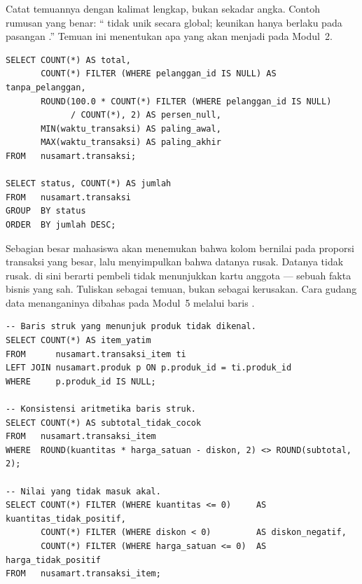 Catat temuannya dengan kalimat lengkap, bukan sekadar angka. Contoh rumusan
yang benar: `` tidak unik secara global; keunikan hanya
berlaku pada pasangan .'' Temuan ini
menentukan apa yang akan menjadi  pada Modul~2.


\begin{lstlisting}[style=sqlgaya]
SELECT COUNT(*) AS total,
       COUNT(*) FILTER (WHERE pelanggan_id IS NULL) AS tanpa_pelanggan,
       ROUND(100.0 * COUNT(*) FILTER (WHERE pelanggan_id IS NULL)
             / COUNT(*), 2) AS persen_null,
       MIN(waktu_transaksi) AS paling_awal,
       MAX(waktu_transaksi) AS paling_akhir
FROM   nusamart.transaksi;

SELECT status, COUNT(*) AS jumlah
FROM   nusamart.transaksi
GROUP  BY status
ORDER  BY jumlah DESC;
\end{lstlisting}

\begin{peringatan}
Sebagian besar mahasiswa akan menemukan bahwa kolom 
bernilai  pada proporsi transaksi yang besar, lalu menyimpulkan
bahwa datanya rusak. Datanya tidak rusak.  di sini berarti
pembeli tidak menunjukkan kartu anggota --- sebuah fakta bisnis yang sah.
Tuliskan sebagai temuan, bukan sebagai kerusakan. Cara gudang data menanganinya
dibahas pada Modul~5 melalui baris .
\end{peringatan}


\begin{lstlisting}[style=sqlgaya]
-- Baris struk yang menunjuk produk tidak dikenal.
SELECT COUNT(*) AS item_yatim
FROM      nusamart.transaksi_item ti
LEFT JOIN nusamart.produk p ON p.produk_id = ti.produk_id
WHERE     p.produk_id IS NULL;

-- Konsistensi aritmetika baris struk.
SELECT COUNT(*) AS subtotal_tidak_cocok
FROM   nusamart.transaksi_item
WHERE  ROUND(kuantitas * harga_satuan - diskon, 2) <> ROUND(subtotal, 2);

-- Nilai yang tidak masuk akal.
SELECT COUNT(*) FILTER (WHERE kuantitas <= 0)     AS kuantitas_tidak_positif,
       COUNT(*) FILTER (WHERE diskon < 0)         AS diskon_negatif,
       COUNT(*) FILTER (WHERE harga_satuan <= 0)  AS harga_tidak_positif
FROM   nusamart.transaksi_item;
\end{lstlisting}


